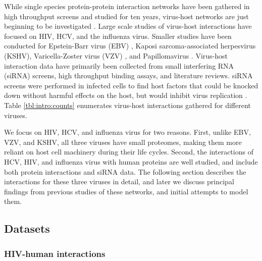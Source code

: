 

While single species protein-protein interaction networks have been
gathered in high throughput screens and studied for ten years,
virus-host networks are just beginning to be investigated
\cite{mendez2010global}. Large scale studies of virus-host
interactions have focused on HIV, HCV, and the influenza virus.
Smaller studies have been conducted for Epstein-Barr virus (EBV)
\cite{calderwood07}, Kaposi sarcoma-associated herpesvirus (KSHV),
Varicella-Zoster virus (VZV) \cite{uetz2006herpesviral}, and
Papillomavirus \cite{driscoll2009pig}. Virus-host interaction data
have primarily been collected from small interfering RNA (siRNA)
screens, high throughput binding assays, and literature reviews. siRNA
screens were performed in infected cells to find host factors that
could be knocked down without harmful effects on the host, but would
inhibit virus replication \cite{georgel2010virus}. Table
\ref{tbl:intro:counts} enumerates virus-host interactions gathered for
different viruses.



We focus on HIV, HCV, and influenza virus for two reasons. First,
unlike EBV, VZV, and KSHV, all three viruses have small proteomes,
making them more reliant on host cell machinery during their life
cycles. Second, the interactions of HCV, HIV, and influenza virus with
human proteins are well studied, and include both protein interactions
and siRNA data. The following section describes the interactions for
these three viruses in detail, and later we discuss principal findings
from previous studies of these networks, and initial attempts to model
them.

\subsection{Datasets}

\subsubsection{HIV-human interactions}

